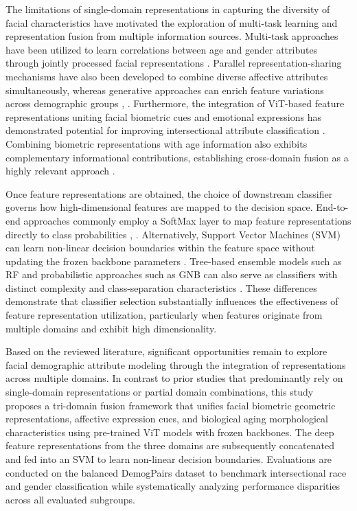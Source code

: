 The limitations of single-domain representations in capturing the diversity of facial characteristics have motivated the exploration of multi-task learning and representation fusion from multiple information sources. Multi-task approaches have been utilized to learn correlations between age and gender attributes through jointly processed facial representations \cite{ref12}. Parallel representation-sharing mechanisms have also been developed to combine diverse affective attributes simultaneously, whereas generative approaches can enrich feature variations across demographic groups \cite{ref16}, \cite{ref15}. Furthermore, the integration of ViT-based feature representations uniting facial biometric cues and emotional expressions has demonstrated potential for improving intersectional attribute classification \cite{ref19}. Combining biometric representations with age information also exhibits complementary informational contributions, establishing cross-domain fusion as a highly relevant approach \cite{ref20}.

Once feature representations are obtained, the choice of downstream classifier governs how high-dimensional features are mapped to the decision space. End-to-end approaches commonly employ a SoftMax layer to map feature representations directly to class probabilities \cite{ref11}, \cite{ref18}. Alternatively, Support Vector Machines (SVM) can learn non-linear decision boundaries within the feature space without updating the frozen backbone parameters \cite{ref13}. Tree-based ensemble models such as RF and probabilistic approaches such as GNB can also serve as classifiers with distinct complexity and class-separation characteristics \cite{ref12}. These differences demonstrate that classifier selection substantially influences the effectiveness of feature representation utilization, particularly when features originate from multiple domains and exhibit high dimensionality.

Based on the reviewed literature, significant opportunities remain to explore facial demographic attribute modeling through the integration of representations across multiple domains. In contrast to prior studies that predominantly rely on single-domain representations or partial domain combinations, this study proposes a tri-domain fusion framework that unifies facial biometric geometric representations, affective expression cues, and biological aging morphological characteristics using pre-trained ViT models with frozen backbones. The deep feature representations from the three domains are subsequently concatenated and fed into an SVM to learn non-linear decision boundaries. Evaluations are conducted on the balanced DemogPairs dataset to benchmark intersectional race and gender classification while systematically analyzing performance disparities across all evaluated subgroups.
